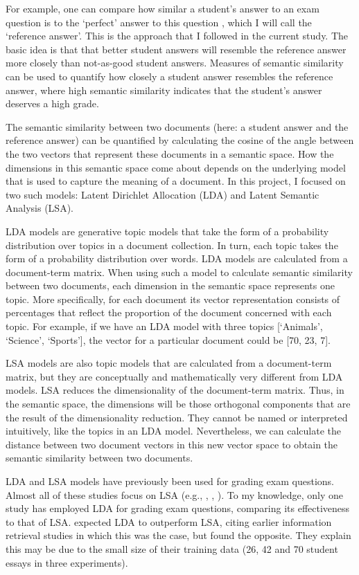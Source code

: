 \documentclass[a4paper,10pt,twoside]{article}
\begin{document}
For example, one can compare how similar a student's answer to an exam question is to the `perfect' answer to this question \cite{wolfe1998}, which I will call the `reference answer'. This is the approach that I followed in the current study. The basic idea is that that better student answers will resemble the reference answer more closely than not-as-good student answers. Measures of semantic similarity can be used to quantify how closely a student answer resembles the reference answer, where high semantic similarity indicates that the student's answer deserves a high grade.

The semantic similarity between two documents (here: a student answer and the reference answer) can be quantified by calculating the cosine of the angle between the two vectors that represent these documents in a semantic space. How the dimensions in this semantic space come about depends on the underlying model that is used to capture the meaning of a document. In this project, I focused on two such models: Latent Dirichlet Allocation (LDA) and Latent Semantic Analysis (LSA).

LDA models \cite{blei2003} are generative topic models that take the form of a probability distribution over topics in a document collection. In turn, each topic takes the form of a probability distribution over words. LDA models are calculated from a document-term matrix. When using such a model to calculate semantic similarity between two documents, each dimension in the semantic space represents one topic. More specifically, for each document its vector representation consists of percentages that reflect the proportion of the document concerned with each topic. For example, if we have an LDA model with three topics [`Animals', `Science', `Sports'], the vector for a particular document could be [70, 23, 7].

LSA models \cite{landauer1997} are also topic models that are calculated from a document-term matrix, but they are conceptually and mathematically very different from LDA models. LSA reduces the dimensionality of the document-term matrix. Thus, in the semantic space, the dimensions will be those orthogonal components that are the result of the dimensionality reduction. They cannot be named or interpreted intuitively, like the topics in an LDA model. Nevertheless, we can calculate the distance between two document vectors in this new vector space to obtain the semantic similarity between two documents.

LDA and LSA models have previously been used for grading exam questions. Almost all of these studies focus on LSA (e.g., , , ). To my knowledge, only one study \cite{kakkonen2008} has employed LDA for grading exam questions, comparing its effectiveness to that of LSA.  expected LDA to outperform LSA, citing earlier information retrieval studies in which this was the case, but found the opposite. They explain this may be due to the small size of their training data (26, 42 and 70 student essays in three experiments).
\end{document}

